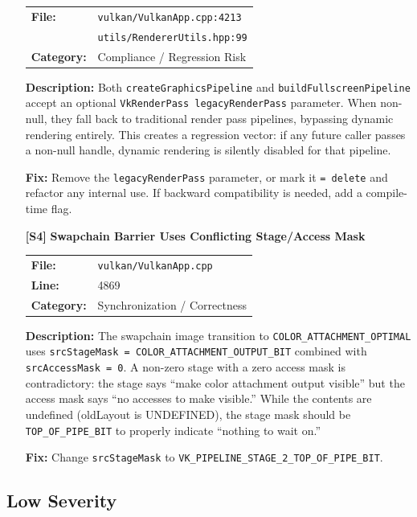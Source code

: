 \documentclass[a4paper,12pt]{article}
\newcommand{\severitybox}[2]{%
  \colorbox{#1}{\makebox[2.5cm][c]{\textcolor{white}{\textbf{#2}}}}%
}
\begin{document}
\begin{enumerate}[leftmargin=*]
  \begin{tabular}{ll}
    \textbf{File:} & \texttt{vulkan/VulkanApp.cpp:4213} \\
    & \texttt{utils/RendererUtils.hpp:99} \\
    \textbf{Category:} & Compliance / Regression Risk \\
  \end{tabular}

  \textbf{Description:}
  Both \texttt{createGraphicsPipeline} and \texttt{buildFullscreenPipeline}
  accept an optional \texttt{VkRenderPass legacyRenderPass} parameter.
  When non-null, they fall back to traditional render pass pipelines,
  bypassing dynamic rendering entirely. This creates a regression vector:
  if any future caller passes a non-null handle, dynamic rendering is
  silently disabled for that pipeline.

  \textbf{Fix:}
  Remove the \texttt{legacyRenderPass} parameter, or mark it
  \texttt{= delete} and refactor any internal use. If backward
  compatibility is needed, add a compile-time flag.

\item[\textbf{[S4]}] \textbf{Swapchain Barrier Uses Conflicting Stage/Access Mask}
  \hfill \severitybox{mediumcolor}{MEDIUM}

  \begin{tabular}{ll}
    \textbf{File:} & \texttt{vulkan/VulkanApp.cpp} \\
    \textbf{Line:} & 4869 \\
    \textbf{Category:} & Synchronization / Correctness \\
  \end{tabular}

  \textbf{Description:}
  The swapchain image transition to \texttt{COLOR\_ATTACHMENT\_OPTIMAL} uses
  \texttt{srcStageMask = COLOR\_ATTACHMENT\_OUTPUT\_BIT} combined with
  \texttt{srcAccessMask = 0}. A non-zero stage with a zero access mask
  is contradictory: the stage says ``make color attachment output visible''
  but the access mask says ``no accesses to make visible.'' While the
  contents are undefined (oldLayout is UNDEFINED), the stage mask should
  be \texttt{TOP\_OF\_PIPE\_BIT} to properly indicate ``nothing to wait on.''

  \textbf{Fix:}
  Change \texttt{srcStageMask} to \texttt{VK\_PIPELINE\_STAGE\_2\_TOP\_OF\_PIPE\_BIT}.

\end{enumerate}

\subsection{Low Severity}
\end{document}
